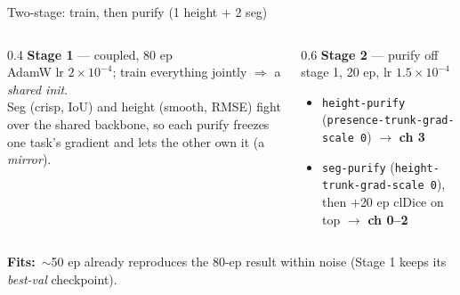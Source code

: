 \documentclass[aspectratio=169,11pt]{beamer}
\newcommand{\fit}{\textcolor{cHead}{\textbf{Fits:}}\ }
\newcommand{\code}[1]{\texttt{\small #1}}
\begin{document}
\begin{frame}{Two-stage: train, then purify (1 height + 2 seg)}
  \vspace{-0.3em}
  \begin{center}
  \end{center}
  \vspace{-0.9em}
  \begin{columns}[T]
    \begin{column}{0.4\textwidth}
      \textbf{\textcolor{cHead}{Stage 1}} --- coupled, 80 ep\\
      \footnotesize AdamW lr $2{\times}10^{-4}$; train everything jointly
      $\Rightarrow$ a \emph{shared init}.\\[3pt]
      Seg (crisp, IoU) and height (smooth, RMSE) fight over the shared backbone, so
      each purify freezes one task's gradient and lets the other own it (a \emph{mirror}).
    \end{column}
    \begin{column}{0.6\textwidth}
      \textbf{\textcolor{cHead}{Stage 2}} --- purify off stage 1, 20 ep, lr $1.5{\times}10^{-4}$\\
      \footnotesize
      \begin{itemize}\scriptsize
        \item \code{height-purify} (\code{presence-trunk-grad-scale 0}) $\to$ \textbf{ch 3}
        \item \code{seg-purify} (\code{height-trunk-grad-scale 0}), then $+$20 ep clDice
          on top $\to$ \textbf{ch 0--2}
      \end{itemize}
    \end{column}
  \end{columns}
  \vspace{0.2em}
  {\footnotesize \fit $\sim$50 ep already reproduces the 80-ep result within noise
   (Stage 1 keeps its \emph{best-val} checkpoint).}
\end{frame}
\end{document}
